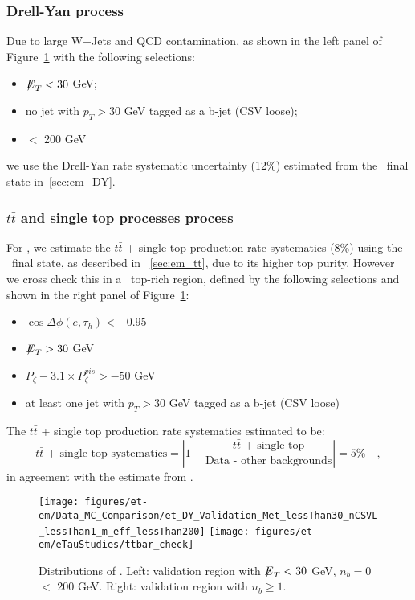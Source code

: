 \subsubsection{Drell-Yan process}
Due to large W+Jets and QCD contamination, as shown in the left panel of 
Figure~\ref{fig:et_dy_tt} with the following selections:
\begin{itemize}
  \item ${\not\mathrel{E}}_T<30$ GeV;
  \item no jet with $p_T>30$ GeV tagged as a b-jet (CSV loose);
  \item \meffetau $<$ 200 GeV
\end{itemize}
we use the Drell-Yan rate systematic uncertainty (12\%) estimated from
the \tetm ~final state in~\ref{sec:em_DY}.

\subsubsection{$t\bar{t}$ and single top processes process}
For \teth, we estimate the $t\bar{t}$ + single top production rate
systematics (8\%) using the \tetm ~final state, as described in
~\ref{sec:em_tt}, due to its higher top purity.  However we cross
check this in a \teth ~top-rich region, defined by the following
selections and shown in the right panel of Figure~\ref{fig:et_dy_tt}:
\begin{itemize}
  \item $\cos{\Delta \phi (e,\tau_{h})}<-0.95$
  \item ${\not\mathrel{E}}_T>30$ GeV
  \item $P_{\zeta}- 3.1 \times P_{\zeta}^{vis} > -50$ GeV
  \item at least one jet with $p_T>30$ GeV tagged as a b-jet (CSV loose)
\end{itemize}
The $t\bar{t}$ + single top production rate systematics estimated to be:
\begin{equation}\label{eq:et_tt}
\text{$t\bar{t}$ + single top systematics} = \left| 1 - \frac{\text{$t\bar{t}$ + single top}}{\text{Data - other backgrounds}}\right| = 5\%\quad,
\end{equation}
in agreement with the estimate from \tetm.

\begin{figure}[thbp!]\centering
  \texttt{[image: figures/et-em/Data\_MC\_Comparison/et\_DY\_Validation\_Met\_lessThan30\_nCSVL\_lessThan1\_m\_eff\_lessThan200]}
  \texttt{[image: figures/et-em/eTauStudies/ttbar\_check]}
  \caption{\label{fig:et_dy_tt} Distributions of \meffetau. Left: validation region with ${\not\mathrel{E}}_T<30$ GeV, $n_b = 0$ \meffetau $<$ 200 GeV.  Right: validation region with $n_b\geq1$.}
\end{figure}


